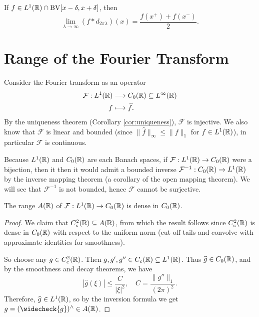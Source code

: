 \begin{theorem}
  If $f \in L^1(\mathbb{R}) \cap \mathrm{BV}[x - \delta, x + \delta]$,
  then
  \[
    \lim_{\lambda \to \infty}(f * d_{2\pi \lambda})(x)
    = \frac{f(x^+) + f(x^-)}{2}.
  \]
\end{theorem}

\section{Range of the Fourier Transform}

\begin{remark}
  Consider the Fourier transform as an operator
  \begin{align*}
    \mathcal{F} : L^1(\mathbb{R}) &\longrightarrow C_0(\mathbb{R}) \subseteq L^\infty(\mathbb{R}) \\
    f &\longmapsto \widehat{f}.
  \end{align*}
  By the uniqueness theorem (Corollary \ref{cor:uniqueness}),
  $\mathcal{F}$ is injective.
  We also know that $\mathcal{F}$ is linear and bounded
  (since $\|\widehat{f}\|_\infty \le \|f\|_1$ for
  $f \in L^1(\mathbb{R})$), in particular $\mathcal{F}$
  is continuous.

  Because $L^1(\mathbb{R})$ and $C_0(\mathbb{R})$ are each Banach spaces,
  if $\mathcal{F} : L^1(\mathbb{R}) \to C_0(\mathbb{R})$ were a bijection,
  then it then it would admit a bounded inverse
  $\mathcal{F}^{-1} : C_0(\mathbb{R}) \to L^1(\mathbb{R})$
  by the inverse mapping theorem (a corollary of the
  open mapping theorem). We will see that
  $\mathcal{F}^{-1}$ is not bounded, hence
  $\mathcal{F}$ cannot be surjective.
\end{remark}

\begin{prop}
  The range $A(\mathbb{R})$ of $\mathcal{F} : L^1(\mathbb{R}) \to C_0(\mathbb{R})$
  is dense in $C_0(\mathbb{R})$.
\end{prop}

\begin{proof}
  We claim that $C^2_c(\mathbb{R}) \subseteq A(\mathbb{R})$,
  from which the result follows
  since $C^2_c(\mathbb{R})$ is dense in $C_0(\mathbb{R})$
  with respect to the uniform norm (cut off tails
  and convolve with approximate identities for smoothness).

  So choose any $g \in C_c^2(\mathbb{R})$.
  Then $g, g', g'' \in C_c(\mathbb{R}) \subseteq L^1(\mathbb{R})$.
  Thus $\widehat{g} \in C_0(\mathbb{R})$, and by the
  smoothness and decay theorems, we have
  \[
    |\widehat{g}(\xi)|
    \le \frac{C}{|\xi|^2}, \quad C = \frac{\|g''\|_1}{(2\pi)^2}.
  \]
  Therefore, $\widehat{g} \in L^1(\mathbb{R})$, so
  by the inversion formula we get
  $g = (\widecheck{g})^\wedge \in A(\R)$.
\end{proof}

